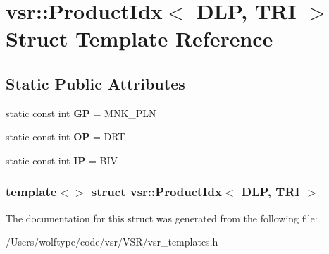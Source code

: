 \hypertarget{structvsr_1_1_product_idx_3_01_d_l_p_00_01_t_r_i_01_4}{\section{vsr\-:\-:Product\-Idx$<$ D\-L\-P, T\-R\-I $>$ Struct Template Reference}
\label{structvsr_1_1_product_idx_3_01_d_l_p_00_01_t_r_i_01_4}
}
\subsection*{Static Public Attributes}
\begin{DoxyCompactItemize}
\item 
\hypertarget{structvsr_1_1_product_idx_3_01_d_l_p_00_01_t_r_i_01_4_a5bafacaf63a9efbcd93135bd3412973e}{static const int {\bfseries G\-P} = M\-N\-K\-\_\-\-P\-L\-N}\label{structvsr_1_1_product_idx_3_01_d_l_p_00_01_t_r_i_01_4_a5bafacaf63a9efbcd93135bd3412973e}

\item 
\hypertarget{structvsr_1_1_product_idx_3_01_d_l_p_00_01_t_r_i_01_4_a4253d794b205c86f327e0a228ca6ff4f}{static const int {\bfseries O\-P} = D\-R\-T}\label{structvsr_1_1_product_idx_3_01_d_l_p_00_01_t_r_i_01_4_a4253d794b205c86f327e0a228ca6ff4f}

\item 
\hypertarget{structvsr_1_1_product_idx_3_01_d_l_p_00_01_t_r_i_01_4_ac303345ecd9ab07bd5ae891c06ee7061}{static const int {\bfseries I\-P} = B\-I\-V}\label{structvsr_1_1_product_idx_3_01_d_l_p_00_01_t_r_i_01_4_ac303345ecd9ab07bd5ae891c06ee7061}

\end{DoxyCompactItemize}
\subsubsection*{template$<$$>$ struct vsr\-::\-Product\-Idx$<$ D\-L\-P, T\-R\-I $>$}



The documentation for this struct was generated from the following file\-:\begin{DoxyCompactItemize}
\item 
/\-Users/wolftype/code/vsr/\-V\-S\-R/vsr\-\_\-templates.\-h\end{DoxyCompactItemize}
